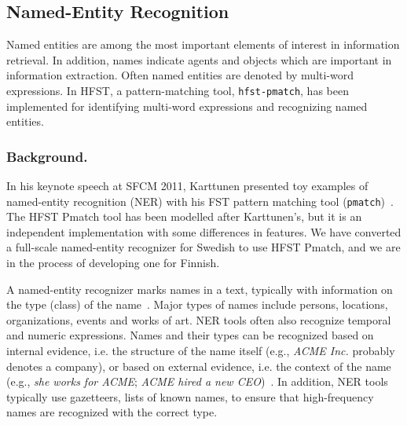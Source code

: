 \documentclass{llncs}
\begin{document}
% 

\subsection{Named-Entity Recognition}
Named entities are among the most important elements of interest in information retrieval.
In addition, names indicate agents and objects which are important in information extraction.
Often named entities are denoted by multi-word expressions. In HFST, a pattern-matching tool,
{\tt hfst-pmatch}, has been implemented for identifying multi-word expressions and recognizing named entities.

\subsubsection{Background.}
In his keynote speech at SFCM 2011, Karttunen presented toy examples of named-entity recognition (NER) with
his FST pattern matching tool (\texttt{pmatch})~\cite{karttunen/2011}. 
The HFST Pmatch tool has been modelled after
Karttunen's, but it is an independent implementation with
some differences in features. We have
converted a full-scale named-entity recognizer for Swedish to use
HFST Pmatch, and we are in the process of developing one for Finnish.

A named-entity recognizer marks names in a text, typically with
information on the type (class) of the name~\cite{nadeau/2007}. Major
types of names include persons, locations, organizations, events and
works of art. NER tools often also recognize temporal and numeric
expressions. Names and their types can be recognized based on internal
evidence, i.e. the structure of the name itself (e.g., \textit{ACME
  Inc.} probably denotes a company), or based on external evidence,
i.e. the context of the name (e.g., \textit{she works for ACME};
\textit{ACME hired a new CEO})~\cite{mcdonald/1996}. In
addition, NER tools typically use gazetteers, lists of known names, to
ensure that high-frequency names are recognized with the correct type.
\end{document}
